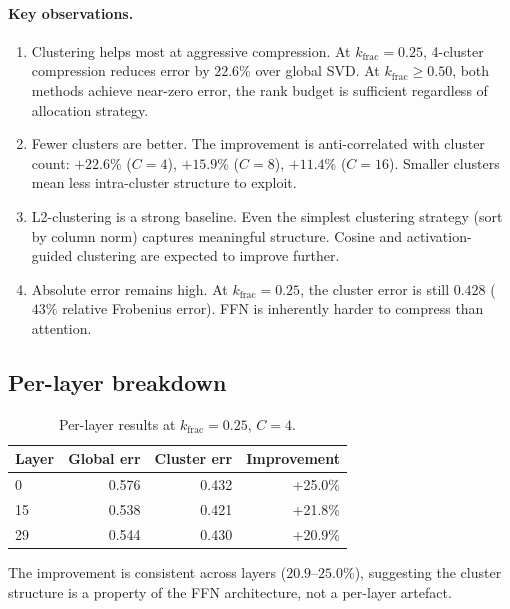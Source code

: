 \documentclass[11pt]{article}
\begin{document}
\paragraph{Key observations.}

\begin{enumerate}
\item Clustering helps most at aggressive compression.
      At $k_\text{frac}{=}0.25$, 4-cluster compression reduces error by
      $22.6\%$ over global SVD.  At $k_\text{frac}{\ge}0.50$, both
      methods achieve near-zero error, the rank budget is sufficient
      regardless of allocation strategy.

\item Fewer clusters are better.  The improvement is
      anti-correlated with cluster count: $+22.6\%$ ($C{=}4$),
      $+15.9\%$ ($C{=}8$), $+11.4\%$ ($C{=}16$).  Smaller clusters
      mean less intra-cluster structure to exploit.

\item L2-clustering is a strong baseline.  Even the simplest
      clustering strategy (sort by column norm) captures meaningful
      structure.  Cosine and activation-guided clustering are expected
      to improve further.

\item Absolute error remains high.  At $k_\text{frac}{=}0.25$,
      the cluster error is still $0.428$ ($43\%$ relative Frobenius
      error).  FFN is inherently harder to compress than attention.
\end{enumerate}

\subsection{Per-layer breakdown}

\begin{table}[h]\centering\small
\caption{Per-layer results at $k_\text{frac}{=}0.25$, $C{=}4$.}
\label{tab:ffn-per-layer}
\begin{tabular}{@{}lrrr@{}}
\toprule
Layer & Global err & Cluster err & Improvement \\
\midrule
0  & 0.576 & 0.432 & +25.0\% \\
15 & 0.538 & 0.421 & +21.8\% \\
29 & 0.544 & 0.430 & +20.9\% \\
\bottomrule
\end{tabular}
\end{table}

The improvement is consistent across layers ($20.9$--$25.0\%$), suggesting
the cluster structure is a property of the FFN architecture, not a
per-layer artefact.
\end{document}
